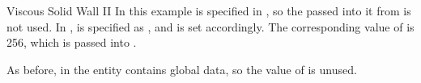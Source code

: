 \begin{example}{Viscous Solid Wall II}
In this example  is specified in ,
so the  passed into it from  is not used.
In ,  is specified as
, and  is set accordingly.
The corresponding value of  is 256, which is passed
into .

As before, in  the entity  contains
global data, so the value of  is unused.
\end{example}

